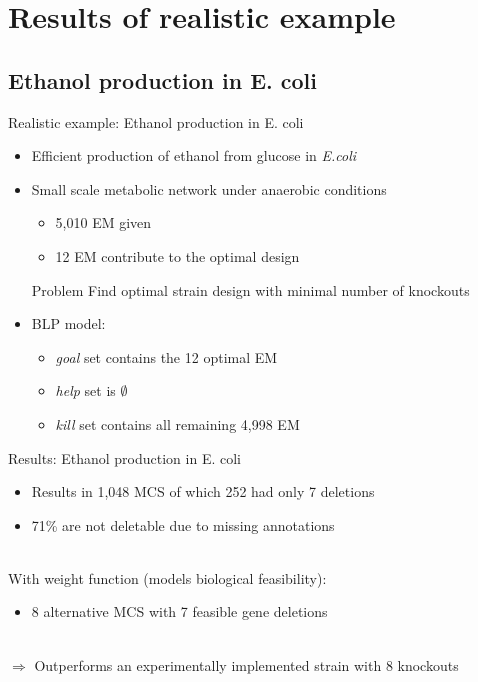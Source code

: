 \documentclass{beamer}
\begin{document}
\section{Results of realistic example}
\subsection{Ethanol production in E. coli}
\begin{frame}{Realistic example: Ethanol production in E. coli}
	\begin{itemize}
		\item Efficient production of ethanol from glucose in \emph{E.coli}
		\item Small scale metabolic network under anaerobic conditions
		\begin{itemize}
			\item 5,010 EM given
			\item 12 EM contribute to the optimal design
		\end{itemize}
\pause
	\begin{block}{Problem}
		 Find optimal strain design with minimal number of knockouts 
	\end{block}
\pause
		\item BLP model:
		\begin{itemize}
			\item \emph{goal} set contains the 12 optimal EM
			\item \emph{help} set is $\emptyset$
			\item \emph{kill} set contains all remaining 4,998 EM
		\end{itemize}
	\end{itemize}
\end{frame}

\begin{frame}{Results: Ethanol production in E. coli}
	\begin{itemize}
	\item Results in 1,048 MCS of which 252 had only 7 deletions
	\item 71\% are not deletable due to missing annotations
	\end{itemize}
~\\
\pause
With weight function (models biological feasibility):
	\begin{itemize}
		\item 8 alternative MCS with 7 feasible gene deletions		
	\end{itemize}
~\\
$\Rightarrow$ Outperforms an  experimentally implemented strain with 8 knockouts
\end{frame}
\end{document}
